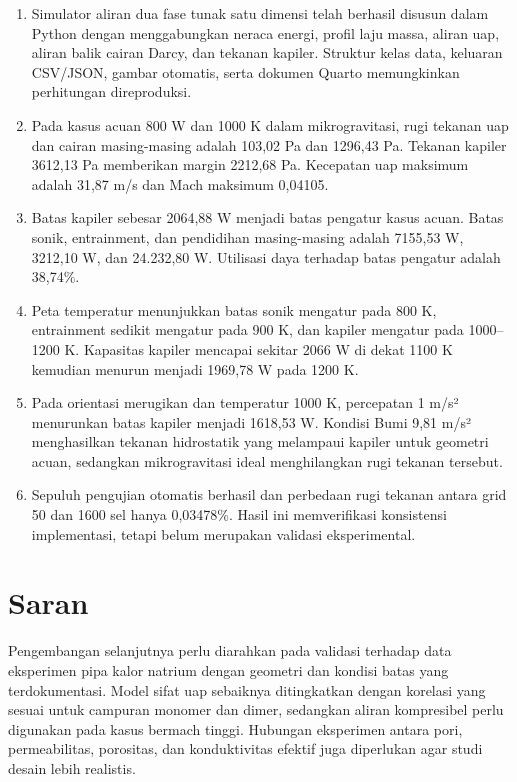 \documentclass[
  12pt,a4paper,oneside]{report}
\providecommand{\tightlist}{%
  \setlength{\itemsep}{0pt}\setlength{\parskip}{0pt}}
\begin{document}
\begin{enumerate}
\def\labelenumi{\arabic{enumi}.}
\tightlist
\item
  Simulator aliran dua fase tunak satu dimensi telah berhasil disusun
  dalam Python dengan menggabungkan neraca energi, profil laju massa,
  aliran uap, aliran balik cairan Darcy, dan tekanan kapiler. Struktur
  kelas data, keluaran CSV/JSON, gambar otomatis, serta dokumen Quarto
  memungkinkan perhitungan direproduksi.
\item
  Pada kasus acuan 800 W dan 1000 K dalam mikrogravitasi, rugi tekanan
  uap dan cairan masing-masing adalah 103,02 Pa dan 1296,43 Pa. Tekanan
  kapiler 3612,13 Pa memberikan margin 2212,68 Pa. Kecepatan uap
  maksimum adalah 31,87 m/s dan Mach maksimum 0,04105.
\item
  Batas kapiler sebesar 2064,88 W menjadi batas pengatur kasus acuan.
  Batas sonik, entrainment, dan pendidihan masing-masing adalah 7155,53
  W, 3212,10 W, dan 24.232,80 W. Utilisasi daya terhadap batas pengatur
  adalah 38,74\%.
\item
  Peta temperatur menunjukkan batas sonik mengatur pada 800 K,
  entrainment sedikit mengatur pada 900 K, dan kapiler mengatur pada
  1000--1200 K. Kapasitas kapiler mencapai sekitar 2066 W di dekat 1100
  K kemudian menurun menjadi 1969,78 W pada 1200 K.
\item
  Pada orientasi merugikan dan temperatur 1000 K, percepatan 1 m/s²
  menurunkan batas kapiler menjadi 1618,53 W. Kondisi Bumi 9,81 m/s²
  menghasilkan tekanan hidrostatik yang melampaui kapiler untuk geometri
  acuan, sedangkan mikrogravitasi ideal menghilangkan rugi tekanan
  tersebut.
\item
  Sepuluh pengujian otomatis berhasil dan perbedaan rugi tekanan antara
  grid 50 dan 1600 sel hanya 0,03478\%. Hasil ini memverifikasi
  konsistensi implementasi, tetapi belum merupakan validasi
  eksperimental.
\end{enumerate}

\hypertarget{saran}{%
\section{Saran}\label{saran}}

Pengembangan selanjutnya perlu diarahkan pada validasi terhadap data
eksperimen pipa kalor natrium dengan geometri dan kondisi batas yang
terdokumentasi. Model sifat uap sebaiknya ditingkatkan dengan korelasi
yang sesuai untuk campuran monomer dan dimer, sedangkan aliran
kompresibel perlu digunakan pada kasus bermach tinggi. Hubungan
eksperimen antara pori, permeabilitas, porositas, dan konduktivitas
efektif juga diperlukan agar studi desain lebih realistis.
\end{document}
